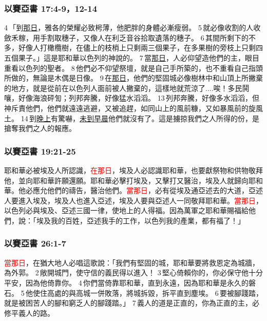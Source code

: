 \subsubsection{以賽亞書 17:4-9，12-14}
4 「到\underline{那日}，雅各的榮耀必致枵薄，他肥胖的身體必漸瘦弱。 5 就必像收割的人收斂禾稼，用手割取穗子，又像人在利乏音谷拾取遺落的穗子。 6 其間所剩下的不多，好像人打橄欖樹，在儘上的枝梢上只剩兩三個果子，在多果樹的旁枝上只剩四五個果子。」這是耶和華以色列的神說的。 7 當\underline{那日}，人必仰望造他們的主，眼目重看以色列的聖者。 8 他們必不仰望祭壇，就是自己手所築的，也不重看自己指頭所做的，無論是木偶是日像。 9 在\underline{那日}，他們的堅固城必像樹林中和山頂上所撇棄的地方，就是從前在以色列人面前被人撇棄的，這樣地就荒涼了....唉！多民鬨嚷，好像海浪砰訇；列邦奔騰，好像猛水滔滔。 13 列邦奔騰，好像多水滔滔，但神斥責他們，他們就遠遠逃避，又被追趕，如同山上的風前糠，又如暴風前的旋風土。 14 到\underline{晚上}有驚嚇，\underline{未到早晨}他們就沒有了。這是擄掠我們之人所得的份，是搶奪我們之人的報應。

\subsubsection{以賽亞書 19:21-25}
耶和華必被埃及人所認識，\textcolor{red}{在那日}，埃及人必認識耶和華，也要獻祭物和供物敬拜他，並向耶和華許願還願。耶和華必擊打埃及，又擊打又醫治，埃及人就歸向耶和華。他必應允他們的禱告，醫治他們。\textcolor{red}{當那日}，必有從埃及通亞述去的大道，亞述人要進入埃及，埃及人也進入亞述，埃及人要與亞述人一同敬拜耶和華。\textcolor{red}{當那日}，以色列必與埃及、亞述三國一律，使地上的人得福。因為萬軍之耶和華賜福給他們，說：「埃及我的百姓，亞述我手的工作，以色列我的產業，都有福了！」


\subsubsection{以賽亞書 26:1-7}
\textcolor{red}{當那日}，在猶大地人必唱這歌說：「我們有堅固的城，耶和華要將救恩定為城牆，為外郭。 2 敞開城門，使守信的義民得以進入！ 3 堅心倚賴你的，你必保守他十分平安，因為他倚靠你。 4 你們當倚靠耶和華，直到永遠，因為耶和華是永久的磐石。 5 他使住高處的與高城一併敗落，將城拆毀，拆平直到塵埃。 6 要被腳踐踏，就是被困苦人的腳和窮乏人的腳踐踏。」 7 義人的道是正直的，你為正直的主，必修平義人的路。

